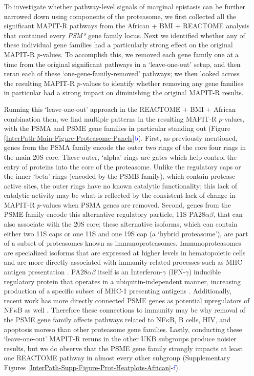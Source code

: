 \documentclass[12pt,a4paper]{article}
\begin{document}
To investigate whether pathway-level signals of marginal epistasis can be further narrowed down using components of the proteasome, we first collected all the significant MAPIT-R pathways from the African + BMI + REACTOME analysis that contained every \emph{PSM*} gene family locus. Next we identified whether any of these individual gene families had a particularly strong effect on the original MAPIT-R $p$-values. To accomplish this, we removed each gene family one at a time from the original significant pathways in a `leave-one-out' setup, and then reran each of these `one-gene-family-removed' pathways; we then looked across the resulting MAPIT-R $p$-values to identify whether removing any gene families in particular had a strong impact on diminishing the original MAPIT-R results.  

Running this `leave-one-out' approach in the REACTOME + BMI + African combination then, we find multiple patterns in the resulting MAPIT-R $p$-values, with the PSMA and PSME gene families in particular standing out (Figure \ref{InterPath-Main-Figure-Proteasome-Panels}\textcolor{blue}{b}). First, as previously mentioned, genes from the PSMA family encode the outer two rings of the core four rings in the main 20S core. These outer, `alpha' rings are gates which help control the entry of proteins into the core of the proteasome. Unlike the regulatory caps or the inner `beta' rings (encoded by the PSMB family), which contain protease active sites, the outer rings have no known catalytic functionality; this lack of catalytic activity may be what is reflected by the consistent lack of change in MAPIT-R $p$-values when PSMA genes are removed. Second, genes from the PSME family encode this alternative regulatory particle, 11S PA28$\alpha\beta$, that can also associate with the 20S core; these alternative isoforms, which can contain either two 11S caps or one 11S and one 19S cap (a `hybrid proteasome'), are part of a subset of proteasomes known as immunoproteasomes. Immunoproteasomes are specialized isoforms that are expressed at higher levels in hematopoietic cells and are more directly associated with immunity-related processes such as MHC antigen presentation \citep{Ferrington2012,Basler2013,McCarthy2015}. PA28$\alpha\beta$ itself is an Interferon-$\gamma$ (IFN-$\gamma$) inducible regulatory protein that operates in a ubiquitin-independent manner, increasing production of a specific subset of MHC-1 presenting antigens \citep{Groettrup1996,de2011,Raule2014,Murata2018}. Additionally, recent work has more directly connected PSME genes as potential upregulators of NF$\kappa$B as well \citep{Sun2016,Mitchell2019}. Therefore these connections to immunity may be why removal of the PSME gene family affects pathways related to NF$\kappa$B, B cells, HIV, and apoptosis moreso than other proteasome gene families. Lastly, conducting these `leave-one-out' MAPIT-R reruns in the other UKB subgroups produce noisier results, but we do observe that the PSME gene family strongly impacts at least one REACTOME pathway in almost every other subgroup (Supplementary Figures \ref{InterPath-Supp-Figure-Prot-Heatplots-African}-\textcolor{blue}{f}). 
\end{document}
